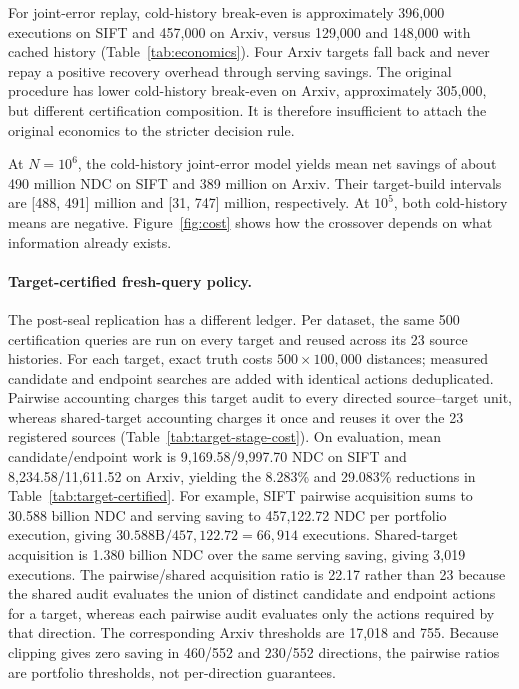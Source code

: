 For joint-error replay, cold-history break-even is approximately 396,000 executions on SIFT and 457,000 on Arxiv, versus 129,000 and 148,000 with cached history (Table~\ref{tab:economics}). Four Arxiv targets fall back and never repay a positive recovery overhead through serving savings. The original procedure has lower cold-history break-even on Arxiv, approximately 305,000, but different certification composition. It is therefore insufficient to attach the original economics to the stricter decision rule.

At $N=10^6$, the cold-history joint-error model yields mean net savings of about 490 million NDC on SIFT and 389 million on Arxiv. Their target-build intervals are [488, 491] million and [31, 747] million, respectively. At $10^5$, both cold-history means are negative. Figure~\ref{fig:cost} shows how the crossover depends on what information already exists.

\paragraph{Target-certified fresh-query policy.}
The post-seal replication has a different ledger. Per dataset, the same 500 certification queries are run on every target and reused across its 23 source histories. For each target, exact truth costs $500\times100{,}000$ distances; measured candidate and endpoint searches are added with identical actions deduplicated. Pairwise accounting charges this target audit to every directed source--target unit, whereas shared-target accounting charges it once and reuses it over the 23 registered sources (Table~\ref{tab:target-stage-cost}). On evaluation, mean candidate/endpoint work is 9,169.58/9,997.70 NDC on SIFT and 8,234.58/11,611.52 on Arxiv, yielding the 8.283\% and 29.083\% reductions in Table~\ref{tab:target-certified}. For example, SIFT pairwise acquisition sums to 30.588 billion NDC and serving saving to 457,122.72 NDC per portfolio execution, giving $30.588\text{B}/457{,}122.72=66{,}914$ executions. Shared-target acquisition is 1.380 billion NDC over the same serving saving, giving 3,019 executions. The pairwise/shared acquisition ratio is 22.17 rather than 23 because the shared audit evaluates the union of distinct candidate and endpoint actions for a target, whereas each pairwise audit evaluates only the actions required by that direction. The corresponding Arxiv thresholds are 17,018 and 755. Because clipping gives zero saving in 460/552 and 230/552 directions, the pairwise ratios are portfolio thresholds, not per-direction guarantees.

